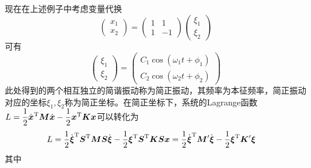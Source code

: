 现在在上述例子中考虑变量代换
\begin{equation*}
	\begin{pmatrix} x_1 \\ x_2 \end{pmatrix} = \begin{pmatrix} 1 & 1 \\ 1 & -1 \end{pmatrix} \begin{pmatrix} \xi_1 \\ \xi_2 \end{pmatrix}
\end{equation*}
可有
\begin{equation*}
	\begin{pmatrix} \xi_1 \\ \xi_2 \end{pmatrix} = \begin{pmatrix} C_1 \cos (\omega_1 t + \phi_1) \\ C_2 \cos (\omega_2 t + \phi_2) \end{pmatrix}
\end{equation*}
此处得到的两个相互独立的简谐振动称为{\heiti 简正振动}，其频率为{\heiti 本征频率}，简正振动对应的坐标$\xi_1,\xi_2$称为{\heiti 简正坐标}。在简正坐标下，系统的Lagrange函数$L = \dfrac12 \dot{\boldsymbol{x}}^{\mathrm{T}} \boldsymbol{M} \dot{\boldsymbol{x}} - \dfrac12 \boldsymbol{x}^{\mathrm{T}} \boldsymbol{K} \boldsymbol{x}$可以转化为
\begin{align*}
	L & = \frac12 \dot{\boldsymbol{\xi}}^{\mathrm{T}} \boldsymbol{S}^{\mathrm{T}} \boldsymbol{M} \boldsymbol{S} \dot{\boldsymbol{\xi}} - \frac12 \boldsymbol{\xi}^{\mathrm{T}} \boldsymbol{S}^{\mathrm{T}} \boldsymbol{K} \boldsymbol{S} \boldsymbol{x} = \frac12 \dot{\boldsymbol{\xi}}^{\mathrm{T}} \boldsymbol{M}' \dot{\boldsymbol{\xi}} - \frac12 \boldsymbol{\xi}^{\mathrm{T}} \boldsymbol{K}' \boldsymbol{\xi}
\end{align*}
其中

